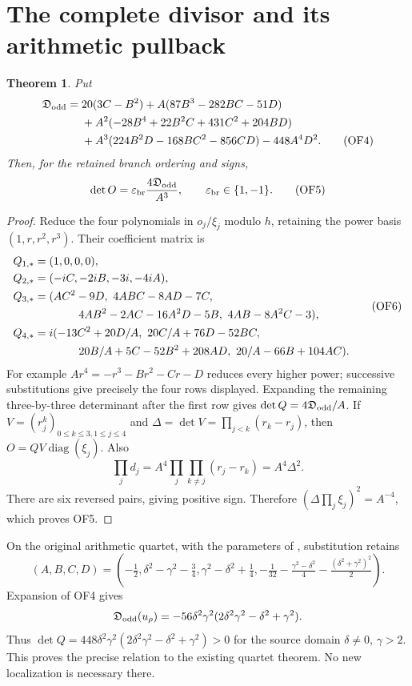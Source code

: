 \documentclass[11pt]{article}
\newtheorem{theorem}{Theorem}
\newcommand{\dd}{\mathfrak D_{\rm odd}}
\newcommand{\diag}{\operatorname{diag}}
\begin{document}
\section{The complete divisor and its arithmetic pullback}
\begin{theorem}
Put
\begin{align}
 \dd={}&20(3C-B^2)+A(87B^3-282BC-51D)\notag\\
 &+A^2(-28B^4+22B^2C+431C^2+204BD)\notag\\
 &+A^3(224B^2D-168BC^2-856CD)-448A^4D^2.
 \tag{OF4}
\end{align}
Then, for the retained branch ordering and signs,
\begin{equation}
 \det O=\varepsilon_{\rm br}\frac{4\dd}{A^3},\qquad
 \varepsilon_{\rm br}\in\{1,-1\}.\tag{OF5}
\end{equation}
\end{theorem}
\begin{proof}
Reduce the four polynomials in $o_j/\xi_j$ modulo $h$, retaining
the power basis $(1,r,r^2,r^3)$. Their coefficient matrix is
\begin{equation}
 \begin{aligned}
 Q_{1,*}&=(1,0,0,0),\\
 Q_{2,*}&=(-iC,-2iB,-3i,-4iA),\\
 Q_{3,*}&=(AC^2-9D,\ 4ABC-8AD-7C,\\
 &\hspace{14mm}4AB^2-2AC-16A^2D-5B,\ 4AB-8A^2C-3),\\
 Q_{4,*}&=i(-13C^2+20D/A,\ 20C/A+76D-52BC,\\
 &\hspace{14mm}20B/A+5C-52B^2+208AD,\ 20/A-66B+104AC).
 \end{aligned}\tag{OF6}
\end{equation}
For example $Ar^4=-r^3-Br^2-Cr-D$ reduces every higher power;
successive substitutions give precisely the four rows displayed.
Expanding the remaining three-by-three determinant after the first
row gives $\det Q=4\dd/A$. If
$V=(r_j^{k})_{0\le k\le3,1\le j\le4}$ and
$\Delta=\det V=\prod_{j<k}(r_k-r_j)$, then
$O=QV\diag(\xi_j)$. Also
\[
 \prod_jd_j=A^4\prod_j\prod_{k\ne j}(r_j-r_k)
 =A^4\Delta^2.
\]
There are six reversed pairs, giving positive sign. Therefore
$(\Delta\prod_j\xi_j)^2=A^{-4}$, which proves OF5.
\end{proof}

On the original arithmetic quartet, with the parameters of
\cite[GF20]{Fable}, substitution retains
\begin{equation}
 (A,B,C,D)=\left(-\tfrac12,\delta^2-\gamma^2-\tfrac34,
 \gamma^2-\delta^2+\tfrac14,
 -\tfrac1{32}-\tfrac{\gamma^2-\delta^2}{4}
 -\tfrac{(\delta^2+\gamma^2)^2}{2}\right).
 \tag{OF7}
\end{equation}
Expansion of OF4 gives
\[
 \dd(u_\rho)=-56\delta^2\gamma^2
                 (2\delta^2\gamma^2-\delta^2+\gamma^2).
\]
Thus $\det Q=448\delta^2\gamma^2
(2\delta^2\gamma^2-\delta^2+\gamma^2)>0$ for the source domain
$\delta\ne0$, $\gamma>2$. This proves the precise relation to the
existing quartet theorem. No new localization is necessary there.
\end{document}
